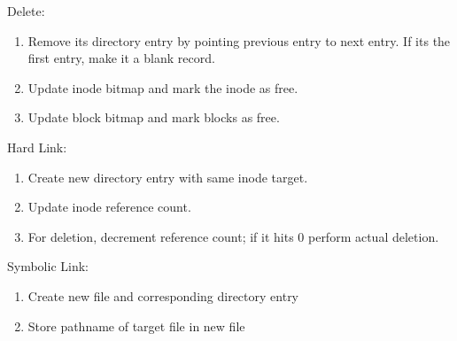 \documentclass[12pt, a4paper]{article}
\begin{document}
\begin{multicols*}{3}
Delete:
\begin{enumerate}[\roman*.]
  \item Remove its directory entry by pointing previous entry to next entry. If its the first entry, make it a blank record.
  \item Update inode bitmap and mark the inode as free.
  \item Update block bitmap and mark blocks as free.
\end{enumerate}

Hard Link:
\begin{enumerate}[\roman*.]
  \item Create new directory entry with same inode target.
  \item Update inode reference count.
  \item For deletion, decrement reference count; if it hits 0 perform actual deletion.
\end{enumerate}

Symbolic Link:
\begin{enumerate}[\roman*.]
  \item Create new file and corresponding directory entry 
  \item Store pathname of target file in new file 
\end{enumerate}

\end{multicols*}
\end{document}
